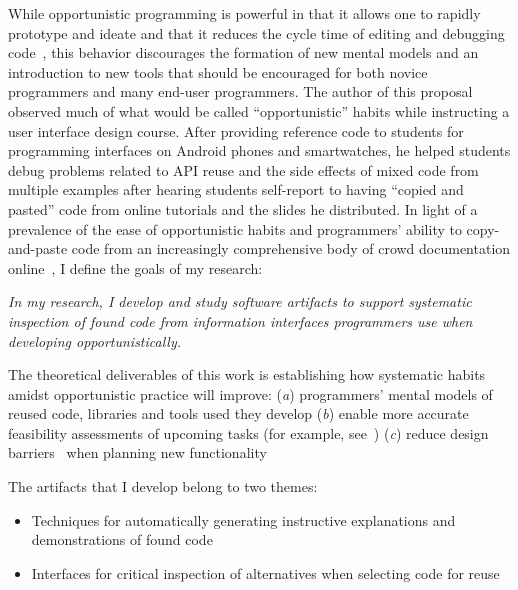 \documentclass[12pt]{memoir}
\begin{document}
While opportunistic programming is powerful in that it allows one to rapidly prototype and ideate and that it reduces the cycle time of editing and debugging code~\cite{brandt_opportunistic_2008}, this behavior discourages the formation of new mental models and an introduction to new tools that should be encouraged for both novice programmers and many end-user programmers.
The author of this proposal observed much of what would be called ``opportunistic'' habits while instructing a user interface design course.
After providing reference code to students for programming interfaces on Android phones and smartwatches, he helped students debug problems related to API reuse and the side effects of mixed code from multiple examples after hearing students self-report to having ``copied and pasted'' code from online tutorials and the slides he distributed.
In light of a prevalence of the ease of opportunistic habits and programmers' ability to copy-and-paste code from an increasingly comprehensive body of crowd documentation online~\cite{parnin_crowd_2012}, I define the goals of my research:

\emph{In my research, I develop and study software artifacts to support systematic inspection of found code from information interfaces programmers use when developing opportunistically.}

The theoretical deliverables of this work is establishing how systematic habits amidst opportunistic practice will improve:
(\emph{a}) programmers' mental models of reused code, libraries and tools used they develop
(\emph{b}) enable more accurate feasibility assessments of upcoming tasks (for example, see~\cite{ko_role_2011})
(\emph{c}) reduce design barriers~\cite{ko_six_2004} when planning new functionality

The artifacts that I develop belong to two themes:
\begin{itemize}[noitemsep]
\item Techniques for automatically generating instructive explanations and demonstrations of found code
\item Interfaces for critical inspection of alternatives when selecting code for reuse
\end{itemize}
\end{document}
